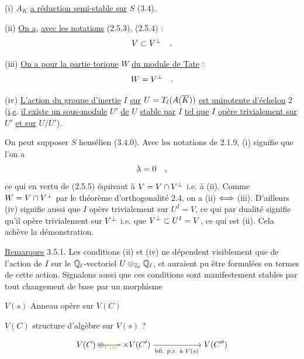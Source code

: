 (i) $A_K$ \uline{a réduction semi-stable sur} $S$ (3.4).

(ii) \uline{On a}, \uline{avec les notations} (2.5.3), (2.5.4) :
\[
V\subset V^{\perp}\quad .
\]

(iii) \uline{On a pour la partie torique} $W$ \uline{du module de Tate} :
\[
W=V^{\perp}\quad .
\]

(iv) \uline{L'action du groupe d'inertie} $I$ \uline{sur} $U=T_{\ell}(A(\overline{K}))$ \uline{est unipotente d'échelon} 2 (\uline{i}.\uline{e}. \uline{il existe un sous-module} $U'$ \uline{de} $U$ \uline{stable par} $I$ \uline{tel que} $I$ \uline{opère trivialement sur} $U'$ \uline{et sur} $U/U'$).

On peut supposer $S$ hensélien (3.4.0). Avec les notations de 2.1.9, (i) signifie que l'on a
\[
\lambda=0\quad ,
\]
ce qui en vertu de (2.5.5) équivaut à $V=V\cap V^{\perp}$ i.e. à (ii). Comme $W=V\cap V^{\perp}$ par le théorème d'orthogonalité 2.4, on a (ii) $\Longleftrightarrow$ (iii). D'ailleurs (iv) signifie aussi que $I$ opère trivialement sur $U^{I}=V$, ce qui par dualité signifie qu'il opère trivialement sur $V^{\perp}$ i.e. que $V^{\perp}\subset U^{I}=V$, ce qui est (ii). Cela achève la démonstration.

\uline{Remarques} 3.5.1. Les conditions (ii) et (iv) ne dépendent visiblement que de l'action de $I$ sur le $\mathbb{Q}_{\ell}$-vectoriel $U\otimes_{\mathbb{Z}_{\ell}}\mathbb{Q}_{\ell}$, et auraient pu être formulées en termes de cette action. Signalons aussi que ces conditions sont manifestement stables par tout changement de base par un morphisme

$V(s)$ Anneau opère sur $V(C)$

$V(C)$ structure d'algèbre sur $V(s)$ ?

\[
V(C)\mathbin{\deleted{\otimes_{\unsure{V(s)}}}}\times V(C')\xrightarrow[\text{bil. p.r. à }V(s)]{}V(C'')
\]

